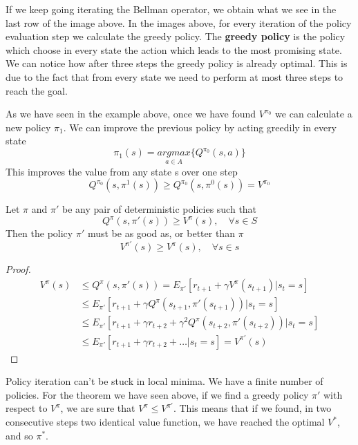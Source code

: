 \documentclass[../main.tex]{subfiles}
\begin{document}
If we keep going iterating the Bellman operator, we obtain what we see in the last row of the image above. In the images above, for every iteration of the policy evaluation step we calculate the greedy policy. The \textbf{greedy policy} is the policy which choose in every state the action which leads to the most promising state. We can notice how after three steps the greedy policy is already optimal. This is due to the fact that from every state we need to perform at most three steps to reach the goal.
\newline
\par
\noindent
As we have seen in the example above, once we have found $V^{\pi_0}$ we can calculate a new policy $\pi_1$. We can improve the previous policy by acting greedily in every state
\begin{equation*}
    \pi_1(s) = \underset{a \in A}{argmax} \bigg\{ Q^{\pi_0}(s,a) \bigg\}
\end{equation*}
This improves the value from any state s over one step
\begin{equation*}
    Q^{\pi_0}(s, \pi^1(s)) \geq Q^{\pi_0}(s, \pi^0(s)) = V^{\pi_0}
\end{equation*}

\begin{theorem}
    Let $\pi$ and $\pi'$ be any pair of deterministic policies such that
    \begin{equation*}
        Q^{\pi}(s, \pi'(s)) \geq V^{\pi}(s), \quad \forall s \in S
    \end{equation*}
    Then the policy $\pi'$ must be as good as, or better than $\pi$
    \begin{equation*}
        V^{\pi'}(s) \geq V^{\pi}(s), \quad \forall s \in s
    \end{equation*}
\end{theorem}
\begin{proof}
    \begin{align*}
        V^{\pi}(s) & \leq Q^{\pi}(s,\pi'(s)) = E_{\pi'}[r_{t+1} + \gamma V^{\pi}(s_{t+1})|s_t=s]              \\
                   & \leq E_{\pi'}[r_{t+1} + \gamma Q^{\pi}(s_{t+1}, \pi'(s_{t+1}))|s_t=s]                    \\
                   & \leq E_{\pi'}[r_{t+1} + \gamma r_{t+2} + \gamma^2 Q^{\pi}(s_{t+2}, \pi'(s_{t+2}))|s_t=s] \\
                   & \leq E_{\pi'}[r_{t+1} + \gamma r_{t+2} + \dots|s_t=s] = V^{\pi'}(s)
    \end{align*}
\end{proof}
\par
\noindent
Policy iteration can't be stuck in local minima. We have a finite number of policies. For the theorem we have seen above, if we find a greedy policy $\pi'$ with respect to $V^{\pi}$, we are sure that $V^{\pi} \leq V^{\pi'}$. This means that if we found, in two consecutive steps two identical value function, we have reached the optimal $V^*$, and so $\pi^*$.
\end{document}

